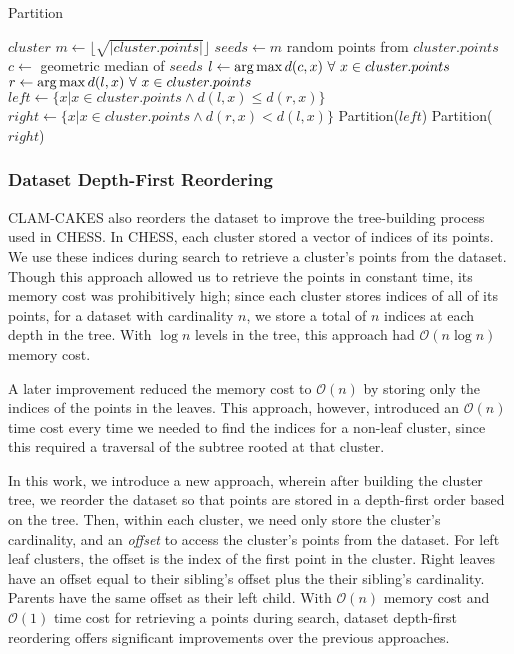 \begin{algorithm} %
\caption{Partition} %
\label{alg:partition} %
\begin{algorithmic}[1] %
    \REQUIRE $cluster$
    \STATE $m \leftarrow \lfloor \sqrt{|cluster.points|} \rfloor$
    \STATE $seeds \leftarrow m$ random points from $cluster.points$
    \STATE $c \leftarrow$ geometric median of $seeds$
    \STATE $l \leftarrow \operatorname*{arg\,max} d(c,x) \ \forall \ x \in cluster.points$
    \STATE $r \leftarrow \operatorname*{arg\,max} d(l,x) \ \forall \ x \in cluster.points$
    \STATE $left \leftarrow \{x | x \in cluster.points \land d(l,x) \le d(r,x)\}$
    \STATE $right \leftarrow \{x | x \in cluster.points \land d(r,x) < d(l,x)\}$
        \STATE Partition($left$)
    \ENDIF
        \STATE Partition($right$)
    \ENDIF
\end{algorithmic}
\end{algorithm}

\subsubsection {Dataset Depth-First Reordering}

CLAM-CAKES also reorders the dataset to improve the tree-building process 
used in CHESS. In CHESS, each cluster stored a vector of indices of its points. 
We use these indices during search to retrieve a cluster's points from the dataset. 
Though this approach allowed us to retrieve the points in constant 
time, its memory cost was prohibitively high; since each cluster stores indices of all of its
points, for a dataset with cardinality $n$, we store a total of $n$ indices at each depth in the tree.
With $\log{}n$ levels in the tree, this approach had $\mathcal{O}(n\log{}n)$ memory cost. 


A later improvement reduced the memory cost to $\mathcal{O}(n)$ by storing only the indices of the points in the leaves.
This approach, however, introduced an $\mathcal{O}(n)$ time cost every time we needed to find the indices for 
a non-leaf cluster, since this required a traversal of the subtree rooted at that cluster.


In this work, we introduce a new approach, wherein after building the cluster tree, we reorder the dataset 
so that points are stored in a depth-first order based on the tree. Then, within each cluster, we need only 
store the cluster's cardinality, and an \emph{offset} to access the cluster's points from the dataset.
For left leaf clusters, the offset is the index of the first point in the cluster. Right leaves have an offset 
equal to their sibling's offset plus the their sibling's cardinality. Parents have the same offset as their left child.
With $\mathcal{O}(n)$ memory cost and $\mathcal{O}(1)$ time cost for retrieving a points during search, 
dataset depth-first reordering offers significant improvements over the previous approaches.


